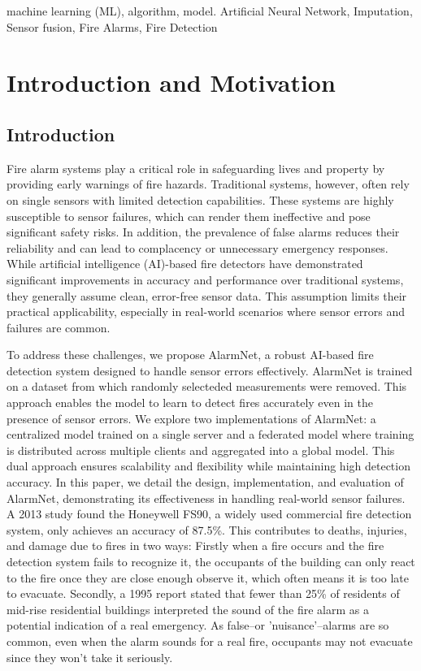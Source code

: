 \documentclass[conference]{IEEEtran}
\begin{document}
\begin{IEEEkeywords}
machine learning (ML), algorithm, model. Artificial Neural
Network, Imputation, Sensor fusion, Fire Alarms, Fire
Detection
\end{IEEEkeywords}

\section{Introduction and Motivation}
\subsection{Introduction}\label{intro} 

Fire alarm systems play a critical role in safeguarding
lives and property by providing early warnings of fire
hazards. Traditional systems, however, often rely on single
sensors with limited detection capabilities. These systems
are highly susceptible to sensor failures, which can render
them ineffective and pose significant safety risks. In
addition, the prevalence of false alarms reduces their
reliability and can lead to complacency or unnecessary
emergency responses. While artificial intelligence
(AI)-based fire detectors have demonstrated significant
improvements in accuracy and performance over traditional
systems, they generally assume clean, error-free sensor
data. This assumption limits their practical applicability,
especially in real-world scenarios where sensor errors and
failures are common.

To address these challenges, we propose AlarmNet, a robust
AI-based fire detection system designed to handle sensor
errors effectively. AlarmNet is trained on a dataset from which
randomly selecteded measurements were removed. This approach
enables the model to learn to detect fires accurately even
in the presence of sensor errors. We explore
two implementations of AlarmNet: a centralized model trained
on a single server and a federated model where training is
distributed across multiple clients and aggregated into a
global model. This dual approach ensures scalability and
flexibility while maintaining high detection accuracy. In
this paper, we detail the design, implementation, and
evaluation of AlarmNet, demonstrating its effectiveness in
handling real-world sensor failures. A 2013 study found the
Honeywell FS90, a widely used commercial fire detection
system, only achieves an accuracy of 87.5\%\cite{smokeacc}.
This contributes to deaths, injuries, and damage due to
fires in two ways: Firstly when a fire occurs and the fire
detection system fails to recognize it, the occupants of the
building can only react to the fire once they are close
enough observe it, which often means it is too late to
evacuate. Secondly, a 1995 report stated that fewer than
25\% of residents of mid-rise residential buildings
interpreted the sound of the fire alarm as a potential
indication of a real emergency\cite{crywolf}. As false--or
'nuisance'--alarms are so common, even when the alarm sounds
for a real fire, occupants may not evacuate since they won't
take it seriously.
\end{document}
